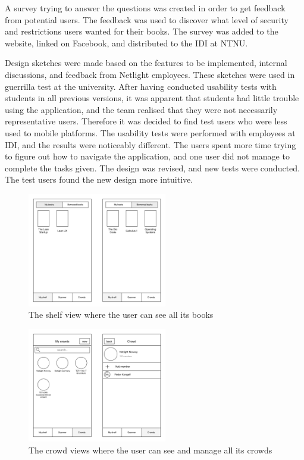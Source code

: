 A survey trying to answer the questions was created in order to get feedback from potential users. The feedback was used to discover what level of security and restrictions users wanted for their books. The survey was added to the website, linked on Facebook, and distributed to the \gls{IDI} at \gls{NTNU}.

Design sketches were made based on the features to be implemented, internal discussions, and feedback from Netlight employees. These sketches were used in \gls{guerrilla test} at the university. After having conducted usability tests with students in all previous versions, it was apparent that students had little trouble using the application, and the team realised that they were not necessarily representative users. Therefore it was decided to find test users who were less used to mobile platforms. The usability tests were performed with employees at \gls{IDI}, and the results were noticeably different. The users spent more time trying to figure out how to navigate the application, and one user did not manage to complete the tasks given. The design was revised, and new tests were conducted. The test users found the new design more intuitive.

\begin{figure}
    \centering
    \includegraphics[height=5cm]{figs/v04/Shelf.png}
    \caption{The shelf view where the user can see all its books}
    \label{fig:ios-shelf}
\end{figure}

\begin{figure}
\centering
\includegraphics[height=5cm]{figs/v04/Crowd.png}
\caption{The crowd views where the user can see and manage all its crowds}
\label{fig:ios-crowd}
\end{figure}

